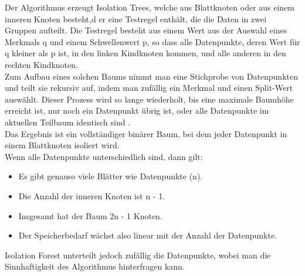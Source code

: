 \documentclass[a4paper,12pt]{article}
\begin{document}
	Der Algorithmus erzeugt Isolation Trees, welche aus Blattknoten oder aus einem inneren Knoten besteht,d er eine Testregel enthält, die die Daten in zwei Gruppen aufteilt. Die Testregel besteht aus einem Wert aus der Auswahl eines Merkmals  q und einem Schwellenwert p, so dass alle Datenpunkte, deren Wert für q kleiner als p ist, in den linken Kindknoten kommen, und alle anderen in den rechten Kindknoten.
	\\[0.5em]
	Zum Aufbau eines solchen Baums nimmt man eine Stichprobe von Datenpunkten und teilt sie rekursiv auf, indem man zufällig ein Merkmal und einen Split-Wert auswählt. Dieser Prozess wird so lange wiederholt, bis
	eine maximale Baumhöhe erreicht ist, nur noch ein Datenpunkt übrig ist, oder
	alle Datenpunkte im aktuellen Teilbaum identisch sind \cite{liu2008isolation}.
	\\[0.5em]
	Das Ergebnis ist ein vollständiger binärer Baum, bei dem jeder Datenpunkt in einem Blattknoten isoliert wird.
	\\[0.5em]
	Wenn alle Datenpunkte unterschiedlich sind, dann gilt:
	\begin{itemize}
	\item Es gibt genauso viele Blätter wie Datenpunkte (n).
	
	\item Die Anzahl der inneren Knoten ist n - 1.
	
	\item Insgesamt hat der Baum 2n - 1 Knoten.
	
	\item Der Speicherbedarf wächst also linear mit der Anzahl der Datenpunkte.
	\end{itemize}
	
	Isolation Forest unterteilt jedoch zufällig die Datenpunkte, wobei man die Sinnhaftigkeit des Algorithmus hinterfragen kann.
	
\end{document}
